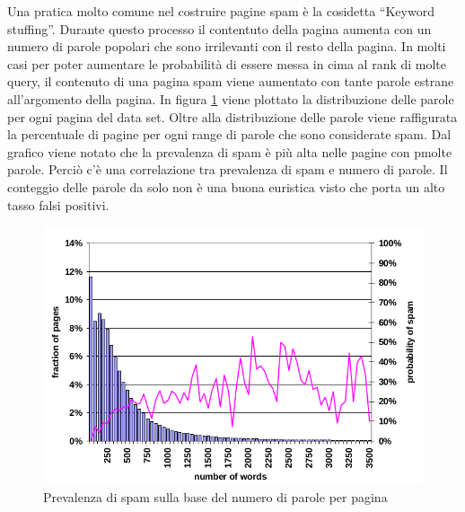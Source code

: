 Una pratica molto comune nel costruire pagine spam è la cosidetta ``Keyword stuffing''. Durante questo processo il contentuto della pagina aumenta con un numero di parole popolari che sono irrilevanti con il resto della pagina. In molti casi per poter aumentare le probabilità di essere messa in cima al rank di molte query, il contenuto di una pagina spam viene aumentato con tante parole estrane all'argomento della pagina. In figura \ref{fig:fetterly3} viene plottato la distribuzione delle parole per ogni pagina del data set. Oltre alla distribuzione delle parole viene raffigurata la percentuale di pagine per ogni range di parole che sono considerate spam. Dal grafico viene notato che la prevalenza di spam è più alta nelle pagine con pmolte parole. Perciò c'è una correlazione tra prevalenza di spam e numero di parole. Il conteggio delle parole da solo non è una buona euristica visto che porta un alto tasso falsi positivi.
\begin{figure}[htbp]
\centering
\includegraphics[width=12cm]{immagini/fetterly/fetterly3}
\caption{Prevalenza di spam sulla base del numero di parole per pagina}
\label{fig:fetterly3}
\end{figure}

